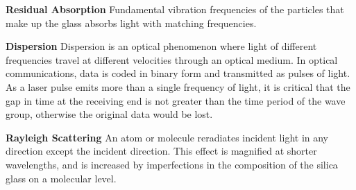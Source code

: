 \documentclass[a0paper,portrait]{baposter}
\begin{document}
\begin{poster}
{\textbf{Residual Absorption}
Fundamental vibration frequencies of the particles that make up the glass absorbs light with matching frequencies.   

\textbf {Dispersion}
Dispersion is an optical phenomenon where light of different frequencies travel at different velocities through an optical medium. In optical communications, data is coded in binary form and transmitted as pulses of light. As a laser pulse emits more than a single frequency of light, it is critical that the gap in time at the receiving end is not greater than the time period of the wave group, otherwise the original data would be lost. 

\textbf {Rayleigh Scattering}
An atom or molecule reradiates incident light in any direction except the incident direction. This effect is magnified at shorter wavelengths, and is increased by imperfections in the composition of the silica glass on a molecular level. 

}

\end{poster}
\end{document}
